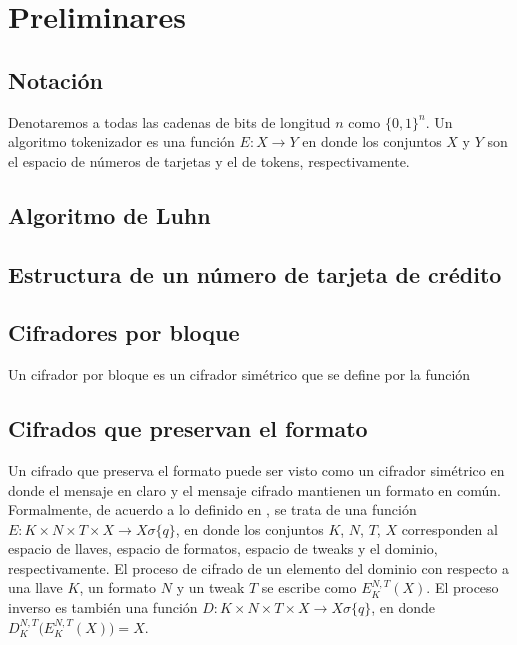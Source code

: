 %
%

\section{Preliminares}


\subsection{Notación}

Denotaremos a todas las cadenas de bits de longitud $ n $ como $ \{ 0, 1 \}^n $. Un algoritmo tokenizador es una función $ E: X \rightarrow Y $ en donde los conjuntos $ X $ y $ Y $ son el espacio de números de tarjetas y el de tokens, respectivamente.

\subsection{Algoritmo de Luhn}

\subsection{Estructura de un número de tarjeta de crédito}

\subsection{Cifradores por bloque}

Un cifrador por bloque es un cifrador simétrico que se define por la función $  $

\subsection{Cifrados que preservan el formato}


Un cifrado que preserva el formato puede ser visto como un cifrador simétrico en donde el mensaje en claro y el mensaje cifrado mantienen un formato en común. Formalmente, de acuerdo a lo definido en \cite{}, se trata de una función $ E: K \times N \times T \times X \rightarrow X \sigma \{ q \} $, en donde los conjuntos $ K $, $ N $, $ T $, $ X $ corresponden al espacio de llaves, espacio de formatos, espacio de tweaks y el dominio, respectivamente. El proceso de cifrado de un elemento del dominio con respecto a una llave $ K $, un formato $ N $ y un tweak $ T $ se escribe como  $ E_K^{N,T}(X) $. El proceso inverso es también una función $ D: K \times N \times T \times X \rightarrow X \sigma \{ q \} $, en donde $ D_K^{N,T}\big( E_K^{N,T}(X) \big) = X $.

